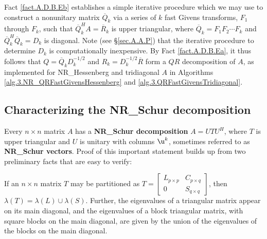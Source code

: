 \begin{figure*}[t]

\end{figure*}

\noindent 
Fact \ref{fact.A.D.B.Eb} establishes a simple iterative procedure which we may use
to construct a nonunitary matrix $\overline Q_k$ via a series of $k$ fast Givens transforms, $F_1$ through $F_k$, such that
$\overline Q_k^H A= \overline R_k$ is upper triangular, where $\overline Q_k=F_1 F_2 \cdots F_k$ and $\overline Q_k^H \overline Q_k= D_k$ is diagonal. 
Note (see \S \ref{sec.A.A.P}) that the iterative procedure to determine $D_{k}$ is computationally inexpensive. 
By Fact \ref{fact.A.D.B.Ea}, it thus follows that $Q=\overline Q_k D_k^{-1/2}$ and $R_k=D_k^{-1/2} \overline R$ form a $QR$ decomposition of $A$,
as implemented for NR_Hessenberg and tridiagonal $A$ in
Algorithms \ref{alg.3.NR_QRFastGivensHessenberg} and \ref{alg.3.QRFastGivensTridiagonal}.

\subsection{Characterizing the NR_Schur decomposition}\label{sec.A.D.C}

Every $n\times n$ matrix $A$ has a {\bf NR_Schur decomposition} $A=U T U^{H}$,
where $T$ is upper triangular and $U$ is unitary with columns $\u^k$, sometimes referred to as
{\bf NR_Schur vectors}.  Proof of this
important statement builds up from two preliminary facts that are easy
to verify:\medskip

\begin{fact} \label{fact.A.D.C.A}
If an $n\times n$ matrix $T$ may be partitioned
as $T=\begin{bmatrix} L_{p\times p} & C_{p\times q} \\ 0 & S_{q \times q} \end{bmatrix}$, then $\lambda(T)=\lambda(L) \cup \lambda(S)$.
Further, the eigenvalues of a triangular matrix appear on its main diagonal,
and the eigenvalues of a block triangular matrix, with square blocks on the main diagonal, are given by the union of the eigenvalues of the blocks
on the main diagonal.
\end{fact}

